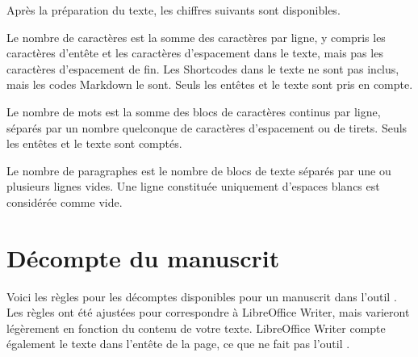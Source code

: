 \documentclass[a4paper,11pt,french]{sphinxmanual}
\begin{document}
\sphinxAtStartPar
Après la préparation du texte, les chiffres suivants sont disponibles.
\begin{description}
\sphinxAtStartPar
Le nombre de caractères est la somme des caractères par ligne, y compris les caractères d’en\sphinxhyphen{}tête et les caractères d’espacement dans le texte, mais pas les caractères d’espacement de fin. Les Shortcodes dans le texte ne sont pas inclus, mais les codes Markdown le sont. Seuls les en\sphinxhyphen{}têtes et le texte sont pris en compte.

\sphinxAtStartPar
Le nombre de mots est la somme des blocs de caractères continus par ligne, séparés par un nombre quelconque de caractères d’espacement ou de tirets. Seuls les en\sphinxhyphen{}têtes et le texte sont comptés.

\sphinxAtStartPar
Le nombre de paragraphes est le nombre de blocs de texte séparés par une ou plusieurs lignes vides. Une ligne constituée uniquement d’espaces blancs est considérée comme vide.

\end{description}


\section{Décompte du manuscrit}
\label{\detokenize{more_counting:manuscript-counts}}
\sphinxAtStartPar
Voici les règles pour les décomptes disponibles pour un manuscrit dans l’outil . Les règles ont été ajustées pour correspondre à LibreOffice Writer, mais varieront légèrement en fonction du contenu de votre texte. LibreOffice Writer compte également le texte dans l’en\sphinxhyphen{}tête de la page, ce que ne fait pas l’outil .
\end{document}

